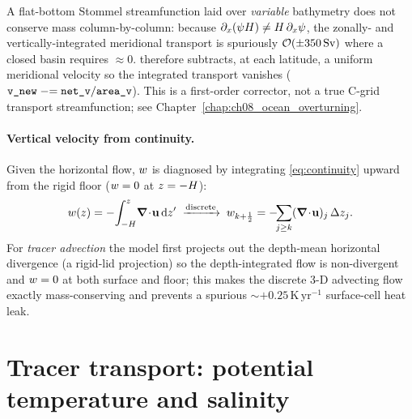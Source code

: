 \begin{remark}
A flat-bottom Stommel streamfunction laid over \emph{variable} bathymetry
does not conserve mass column-by-column: because
$\partial_x(\psi H)\ne H\,\partial_x\psi$, the zonally- and
vertically-integrated meridional transport is spuriously
$\mathcal{O}(\pm350\,\mathrm{Sv})$ where a closed basin requires $\approx 0$.
\model{} therefore subtracts, at each latitude, a uniform meridional
velocity so the integrated transport vanishes
($\texttt{v\_new} \mathrel{-}= \texttt{net\_v}/\texttt{area\_v}$). This is a
first-order corrector, not a true C-grid transport streamfunction; see
Chapter~\ref{chap:ch08_ocean_overturning}.
\end{remark}

\paragraph{Vertical velocity from continuity.}
Given the horizontal flow, $w$ is diagnosed by integrating
\eqref{eq:continuity} upward from the rigid floor ($w=0$ at $z=-H$):
\begin{equation}
  \ww(z) = -\!\int_{-\dep}^{z}\!\diver\uvec\dd z'
  \;\xrightarrow{\text{discrete}}\;
  \ww_{k+\frac12} = -\!\!\sum_{j\ge k}(\diver\uvec)_j\,\Delta z_j .
  \label{eq:w-continuity}
\end{equation}
For \emph{tracer advection} the model first projects out the depth-mean
horizontal divergence (a rigid-lid projection) so the depth-integrated flow
is non-divergent and $w=0$ at both surface and floor; this makes the
discrete 3-D advecting flow exactly mass-conserving and prevents a spurious
$\sim+0.25\,\mathrm{K\,yr^{-1}}$ surface-cell heat leak.

\section{Tracer transport: potential temperature and salinity}

